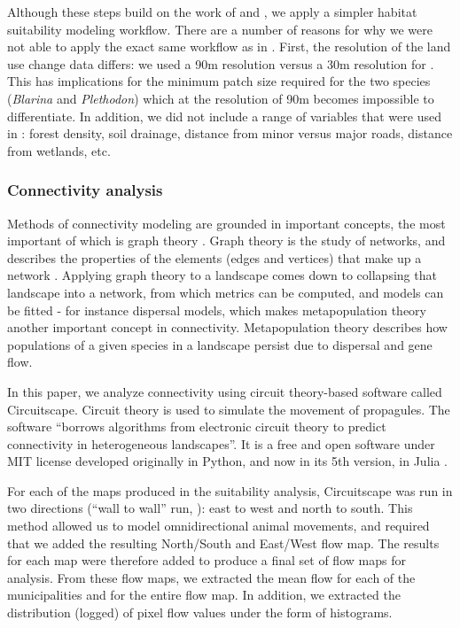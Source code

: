 Although these steps build on the work of \cite{albert_applying_2017} and \cite{rayfield_priorisation_2018}, we apply a simpler habitat suitability modeling workflow. There are a number of reasons for why we were not able to apply the exact same workflow as  in \citeauthor{rayfield_priorisation_2018}. First, the resolution of the land use change data differs: we used a 90m resolution versus a 30m resolution for \citeauthor{rayfield_priorisation_2018}. This has implications for the minimum patch size required for the two species (\textit{Blarina} and \textit{Plethodon}) which at the resolution of 90m becomes impossible to differentiate. In addition, we did not include a range of variables that were used in \citeauthor{rayfield_priorisation_2018}: forest density, soil drainage, distance from minor versus major roads, distance from wetlands, etc.\\

\subsubsection{Connectivity analysis}

Methods of connectivity modeling are grounded in important concepts, the most important of which is graph theory \citep{dale_graphs_2010}. Graph theory is the study of networks, and describes the properties of the elements (edges and vertices) that make up a network . Applying graph theory to a landscape comes down to collapsing that landscape into a network, from which metrics can be computed, and models can be fitted - for instance dispersal models, which makes metapopulation theory another important concept in connectivity\citep{hanski_habitat_1999}. Metapopulation theory describes how populations of a given species in a landscape persist due to dispersal and gene flow.

In this paper, we analyze connectivity using circuit theory-based software called Circuitscape. Circuit theory is used to simulate the movement of propagules. The software “borrows algorithms from electronic circuit theory to predict connectivity in heterogeneous landscapes''. It is a free and open software under MIT license developed originally in Python, and now in its 5th version, in Julia \citep{circuitjulia}.

For each of the maps produced in the suitability analysis, Circuitscape was run in two directions (“wall to wall” run, \cite{mcrae_conserving_2016}): east to west and north to south. This method allowed us to model omnidirectional animal movements, and required that we added the resulting North/South and East/West flow map. The results for each map were therefore added to produce a final set of flow maps for analysis. From these flow maps, we extracted the mean flow for each of the municipalities and for the entire flow map. In addition, we extracted the distribution (logged) of pixel flow values under the form of histograms. \\

